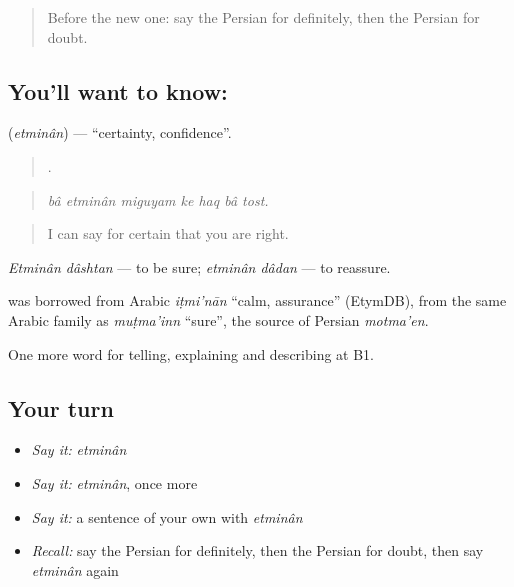\label{lesson:FA-C393-etminan}



\begin{quote}
Before the new one: say the Persian for definitely, then the Persian for doubt.
\end{quote}

\subsection*{You'll want to know: }
\textbf{} (\emph{etminân}) — \textquotedblleft{}certainty, confidence\textquotedblright{}.

\begin{quote}
      .
\end{quote}

\begin{quote}
\emph{bâ etminân miguyam ke haq bâ tost.}
\end{quote}

\begin{quote}
I can say for certain that you are right.
\end{quote}

\emph{Etminân dâshtan} — to be sure; \emph{etminân dâdan} — to reassure.

\begin{cousinweb}
\textbf{} was borrowed from Arabic \emph{iṭmi'nān} \textquotedblleft{}calm, assurance\textquotedblright{} (EtymDB), from the same Arabic family as \emph{muṭma'inn} \textquotedblleft{}sure\textquotedblright{}, the source of Persian \emph{motma'en}.
\end{cousinweb}

\begin{grammarlens}[title={What you've built}]
One more word for telling, explaining and describing at B1.
\end{grammarlens}

\subsection*{Your turn}
\begin{itemize}
\raggedright
  \item \emph{Say it:} \emph{etminân}
  \item \emph{Say it:} \emph{etminân}, once more
  \item \emph{Say it:} a sentence of your own with \emph{etminân}
  \item \emph{Recall:} say the Persian for definitely, then the Persian for doubt, then say \emph{etminân} again
\end{itemize}

